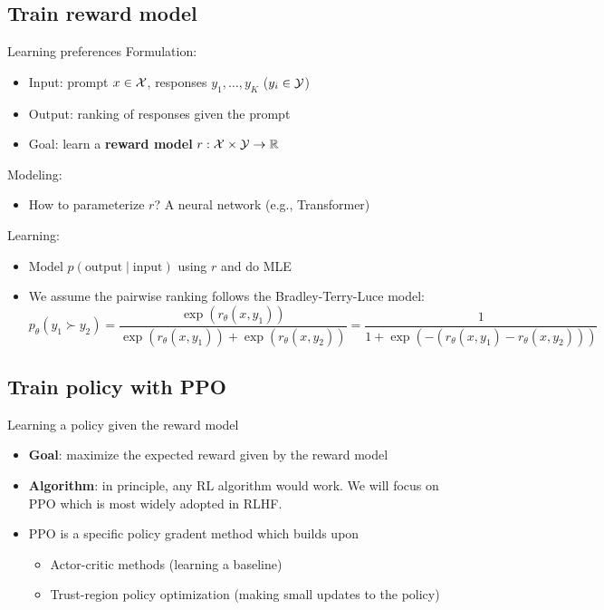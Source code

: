 \documentclass[usenames,dvipsnames,notes,11pt,aspectratio=169,hyperref={colorlinks=true, linkcolor=blue}]{beamer}
\begin{document}
\subsection{Train reward model}
\begin{frame}
    {Learning preferences}
    Formulation:\\
    \begin{itemize}
        \item Input: prompt $x\in\mathcal{X}$, responses $y_1,\ldots, y_K$ ($y_i\in\mathcal{Y}$)
        \item Output: ranking of responses given the prompt
        \item Goal: learn a {\bf reward model} $r: \mathcal{X} \times \mathcal{Y} \rightarrow \mathbb{R}$
    \end{itemize}

    \pause
    Modeling:\\
    \begin{itemize}
        \item How to parameterize $r$? A neural network (e.g., Transformer)
    \end{itemize}

    \pause
    Learning:\\
    \begin{itemize}
        \item Model $p(\text{output}\mid \text{input})$ using $r$ and do MLE
        \item We assume the pairwise ranking follows the Bradley-Terry-Luce model:
            $$
            p_\theta(y_1 \succ y_2) = \frac{\exp(r_\theta(x,y_1))}
            {\exp(r_\theta(x,y_1)) + \exp(r_\theta(x,y_2))}
            = \frac{1}{1+\exp(-(r_\theta(x,y_1) - r_\theta(x,y_2)))}
            $$
    \end{itemize}
\end{frame}

\subsection{Train policy with PPO}
\begin{frame}
    {Learning a policy given the reward model}
    \begin{itemize}
        \itemsep1em
        \item {\bf Goal}: maximize the expected reward given by the reward model
        \item {\bf Algorithm}: in principle, any RL algorithm would work. We will focus on PPO which is most widely adopted in RLHF.
        \item PPO is a specific policy gradent method which builds upon
            \begin{itemize}
                \item Actor-critic methods (learning a baseline)
                \item Trust-region policy optimization (making small updates to the policy) 
            \end{itemize}
    \end{itemize}
\end{frame}
\end{document}
